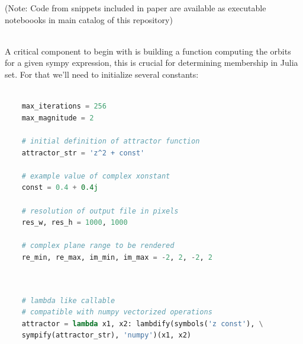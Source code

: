 \documentclass{article}
\begin{document}
\begin{center}
	\scriptsize (Note: Code from snippets included in paper are available as executable noteboooks in main catalog of this repository)
\end{center}

\\[1\baselineskip]
A critical component to begin with is building a function computing the orbits for a given sympy expression, this is crucial for determining membership in Julia set. For that we'll need to initialize several constants:

\begin{lstlisting}[language=Python, caption=Declaring constants]
	
	max_iterations = 256
	max_magnitude = 2
	
	# initial definition of attractor function
	attractor_str = 'z^2 + const'  
	
	# example value of complex xonstant
	const = 0.4 + 0.4j
	
	# resolution of output file in pixels
	res_w, res_h = 1000, 1000  
	
	# complex plane range to be rendered
	re_min, re_max, im_min, im_max = -2, 2, -2, 2  
	
\end{lstlisting}


\begin{lstlisting}[language=Python, caption=Preparing callable iterator]
	
	# lambda like callable
	# compatible with numpy vectorized operations
	attractor = lambda x1, x2: lambdify(symbols('z const'), \
	sympify(attractor_str), 'numpy')(x1, x2)
	
\end{lstlisting}
\pagebreak

\end{document}
